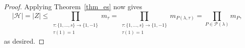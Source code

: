 \documentclass[10pt,a4paper]{article}
\theoremstyle{definition}
\newcommand{\HH}{\mathcal{H}}
\newcommand{\PP}{\mathcal{P}}
\begin{document}
\begin{proof}
    Applying Theorem~\ref{thm_es} now gives
    \[|\HH|=|Z|\le \prod_{\substack{\tau:\{1,\dots,s\}\to \{1,-1\}\\ \tau(1)=1}} m_{\tau}=\prod_{\substack{\tau:\{1,\dots,s\}\to \{1,-1\}\\ \tau(1)=1}} m_{P(\lambda,\tau)}=\prod_{P\in \PP(\lambda)} m_{P},\]
    as desired.
\end{proof}
\end{document}
